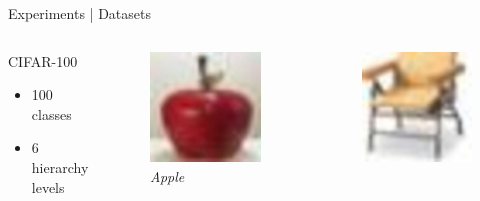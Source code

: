 \begin{frame}{Experiments | Datasets}
  \begin{columns}
    \begin{column}{0.35\textwidth}
      \alert{{\large CIFAR-100}}
      \begin{itemize}
        \item 100 classes
        \item 6 hierarchy levels
      \end{itemize}
    \end{column}
    \begin{column}{0.2\textwidth}
      \begin{figure}
        \centering
        \includegraphics[width=.7\linewidth]{figures/04/CIFAR100/example_1.jpg}
        \captionsetup{labelformat=empty, justification=centering, font=scriptsize}
        \caption{\emph{Apple}}
      \end{figure}
    \end{column}
    \begin{column}{0.2\textwidth}
      \begin{figure}
        \centering
        \includegraphics[width=.7\linewidth]{figures/04/CIFAR100/example_2.jpg}

\end{figure}
\end{column}
\end{columns}
\end{frame}
